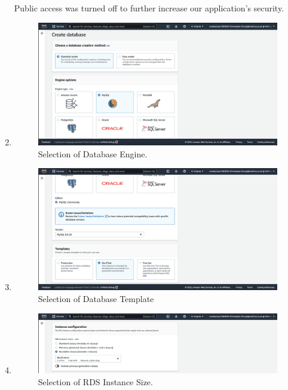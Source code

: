 \begin{enumerate}
    Public access was turned off to further increase our application's security.

    \item
    \begin{figure}[H]
        \centering
        \includegraphics[width=\textwidth]{resources/rds/rds-create-engine}
        \caption{Selection of Database Engine.}
        \label{fig:rds-engine}
    \end{figure}


    \item
    \begin{figure}[H]
        \centering
        \includegraphics[width=\textwidth]{resources/rds/rds-templates}
        \caption{Selection of Database Template}
        \label{fig:rds-templates}
    \end{figure}

    \item
    \begin{figure}[H]
        \centering
        \includegraphics[width=\textwidth]{resources/rds/rds-instance-config}
        \caption{Selection of RDS Instance Size.}
        \label{fig:rds-instance-conf}
    \end{figure}


\end{enumerate}
